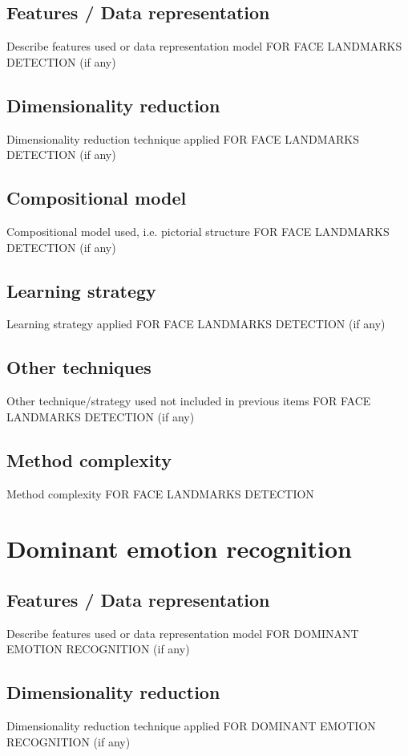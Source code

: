 \documentclass{article}
\begin{document}
\subsection{Features / Data representation}
Describe features used or data representation model FOR FACE LANDMARKS DETECTION (if any)

\subsection{Dimensionality reduction}
Dimensionality reduction technique applied FOR FACE LANDMARKS DETECTION (if any)

\subsection{Compositional model}
Compositional model used, i.e. pictorial structure FOR FACE LANDMARKS DETECTION (if any)

\subsection{Learning strategy}
Learning strategy applied FOR FACE LANDMARKS DETECTION (if any)

\subsection{Other techniques}
Other technique/strategy used not included in previous items FOR FACE LANDMARKS DETECTION (if any)

\subsection{Method complexity}
Method complexity FOR FACE LANDMARKS DETECTION


\section{Dominant emotion recognition}
\subsection{Features / Data representation}
Describe features used or data representation model FOR DOMINANT EMOTION RECOGNITION (if any)

\subsection{Dimensionality reduction}
Dimensionality reduction technique applied FOR DOMINANT EMOTION RECOGNITION (if any)
\end{document}
